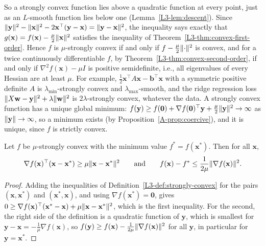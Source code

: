 So a strongly convex function lies above a quadratic function at every point, just as an $L$-smooth function lies below one (Lemma~\ref{L3-lem:descent}). Since $\lVert \mathbf{y} \rVert^2 - \lVert \mathbf{x} \rVert^2 - 2\mathbf{x}^\top(\mathbf{y} - \mathbf{x}) = \lVert \mathbf{y} - \mathbf{x} \rVert^2$, the inequality says exactly that $g(\mathbf{x}) = f(\mathbf{x}) - \frac{\mu}{2}\lVert \mathbf{x} \rVert^2$ satisfies the inequality of Theorem~\ref{L3-thm:convex-first-order}. Hence $f$ is $\mu$-strongly convex if and only if $f - \frac{\mu}{2}\lVert \cdot \rVert^2$ is convex, and for a twice continuously differentiable $f$, by Theorem~\ref{L3-thm:convex-second-order}, if and only if $\nabla^2 f(\mathbf{x}) - \mu I$ is positive semidefinite, i.e., all eigenvalues of every Hessian are at least $\mu$. For example, $\frac{1}{2}\mathbf{x}^\top A\mathbf{x} - \mathbf{b}^\top\mathbf{x}$ with a symmetric positive definite $A$ is $\lambda_{\min}$-strongly convex and $\lambda_{\max}$-smooth, and the ridge regression loss $\lVert X\mathbf{w} - \mathbf{y} \rVert^2 + \lambda\lVert \mathbf{w} \rVert^2$ is $2\lambda$-strongly convex, whatever the data. A strongly convex function has a unique global minimum: $f(\mathbf{y}) \geq f(\mathbf{0}) + \nabla f(\mathbf{0})^\top\mathbf{y} + \frac{\mu}{2}\lVert \mathbf{y} \rVert^2 \to \infty$ as $\lVert \mathbf{y} \rVert \to \infty$, so a minimum exists (by Proposition~\ref{A-prop:coercive}), and it is unique, since $f$ is strictly convex.

\begin{lemma}\label{L3-lem:pl}
    Let $f$ be $\mu$-strongly convex with the minimum value $f^* = f(\mathbf{x}^*)$. Then for all $\mathbf{x}$,
    \[\nabla f(\mathbf{x})^\top(\mathbf{x} - \mathbf{x}^*) \geq \mu\lVert \mathbf{x} - \mathbf{x}^* \rVert^2 \qquad \text{and} \qquad f(\mathbf{x}) - f^* \leq \frac{1}{2\mu}\lVert \nabla f(\mathbf{x}) \rVert^2.\]
\end{lemma}

\begin{proof}
    Adding the inequalities of Definition~\ref{L3-def:strongly-convex} for the pairs $(\mathbf{x}, \mathbf{x}^*)$ and $(\mathbf{x}^*, \mathbf{x})$, and using $\nabla f(\mathbf{x}^*) = \mathbf{0}$, gives $0 \geq \nabla f(\mathbf{x})^\top(\mathbf{x}^* - \mathbf{x}) + \mu\lVert \mathbf{x} - \mathbf{x}^* \rVert^2$, which is the first inequality. For the second, the right side of the definition is a quadratic function of $\mathbf{y}$, which is smallest for $\mathbf{y} - \mathbf{x} = -\frac{1}{\mu}\nabla f(\mathbf{x})$, so $f(\mathbf{y}) \geq f(\mathbf{x}) - \frac{1}{2\mu}\lVert \nabla f(\mathbf{x}) \rVert^2$ for all $\mathbf{y}$, in particular for $\mathbf{y} = \mathbf{x}^*$.
\end{proof}

